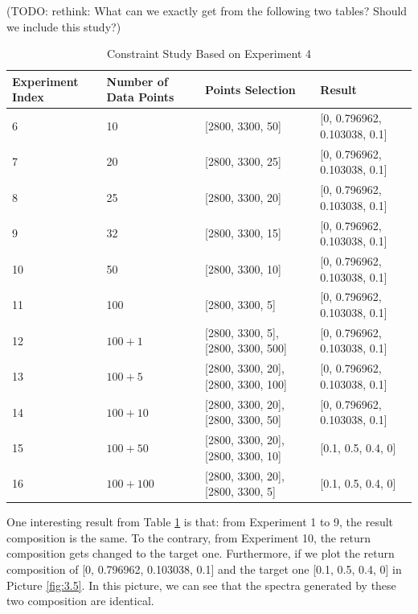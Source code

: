 (TODO: rethink: What can we exactly get from the following two tables? Should we include this study?)

\begin{table} \small
\begin{center}
\begin{tabular}{| l | l | p{3cm} | l |} \hline
	Experiment Index & Number of Data Points & Points Selection & Result \\ \hline
	6 & 10 & [2800, 3300, 50] & [0, 0.796962, 0.103038, 0.1] \\ \hline
	7 & 20 & [2800, 3300, 25] & [0, 0.796962, 0.103038, 0.1] \\ \hline
	8 & 25 & [2800, 3300, 20] & [0, 0.796962, 0.103038, 0.1] \\ \hline
	9 & 32 & [2800, 3300, 15] & [0, 0.796962, 0.103038, 0.1] \\ \hline
	10 & 50 & [2800, 3300, 10] & [0, 0.796962, 0.103038, 0.1] \\ \hline
	11 & 100 & [2800, 3300, 5] & [0, 0.796962, 0.103038, 0.1] \\ \hline
	12 & $100 + 1$ & [2800, 3300, 5], [2800, 3300, 500] & [0, 0.796962, 0.103038, 0.1] \\ \hline
	13 & $100 + 5$ & [2800, 3300, 20], [2800, 3300, 100] & [0, 0.796962, 0.103038, 0.1] \\ \hline
	14 & $100 + 10$ & [2800, 3300, 20], [2800, 3300, 50] & [0, 0.796962, 0.103038, 0.1] \\ \hline
	15 & $100 + 50$ & [2800, 3300, 20], [2800, 3300, 10] & [0.1, 0.5, 0.4, 0] \\ \hline
	16 & $100 + 100$ & [2800, 3300, 20], [2800, 3300, 5] & [0.1, 0.5, 0.4, 0] \\ 
	\hline
\end{tabular} 
\end{center}
\caption{Constraint Study Based on Experiment 4} \label{tab:3.4}
\end{table}

One interesting result from Table \ref{tab:3.4} is that: from Experiment 1 to 9, the result composition is the same. To the contrary, from Experiment 10, the return composition gets changed to the target one. Furthermore, if we plot the return composition of [0, 0.796962, 0.103038, 0.1] and the target one [0.1, 0.5, 0.4, 0] in  Picture \ref{fig:3.5}. In this picture, we can see that the spectra generated by these two composition are identical.

